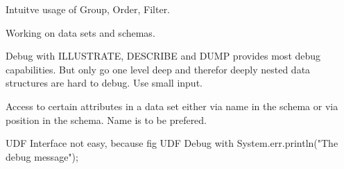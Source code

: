 Intuitve usage of Group, Order, Filter.

Working on data sets and schemas.

Debug with ILLUSTRATE, DESCRIBE and DUMP provides most debug capabilities. But only go one level deep and therefor deeply nested data structures are hard to debug. Use small input. 



Access to certain attributes in a data set either via name in the schema or via position in the schema. Name is to be prefered.




UDF Interface not easy, because fig 
UDF Debug with System.err.println("The debug message");